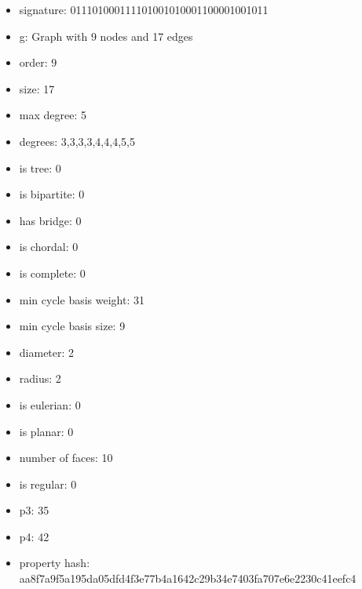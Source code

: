\newpage
\begin{figure}
\end{figure}
\begin{itemize}
\item signature: 011101000111101001010001100001001011
\item g: Graph with 9 nodes and 17 edges
\item order: 9
\item size: 17
\item max degree: 5
\item degrees: 3,3,3,3,4,4,4,5,5
\item is tree: 0
\item is bipartite: 0
\item has bridge: 0
\item is chordal: 0
\item is complete: 0
\item min cycle basis weight: 31
\item min cycle basis size: 9
\item diameter: 2
\item radius: 2
\item is eulerian: 0
\item is planar: 0
\item number of faces: 10
\item is regular: 0
\item p3: 35
\item p4: 42
\item property hash: aa8f7a9f5a195da05dfd4f3e77b4a1642c29b34e7403fa707e6e2230c41eefc4
\end{itemize}
